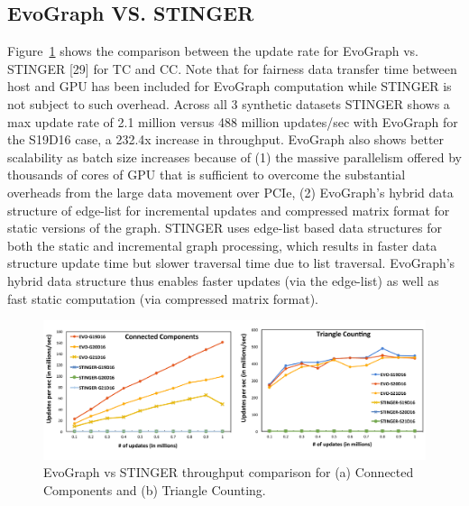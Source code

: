 \subsection{EvoGraph VS. STINGER}
Figure~\ref{fig:stinger} shows the comparison between the update rate for EvoGraph vs. STINGER [29] for TC and CC. Note that for fairness data transfer time between host and GPU has been included for EvoGraph computation while STINGER is not subject to such overhead. Across all 3 synthetic datasets STINGER shows a max update rate of 2.1 million versus 488 million updates/sec with EvoGraph for the S19D16 case, a 232.4x increase in throughput. EvoGraph also shows better scalability as batch size increases because of (1) the massive parallelism offered by thousands of cores of GPU that is sufficient to overcome the substantial overheads from the large data movement over PCIe, (2) EvoGraph’s hybrid data structure of edge-list for incremental updates and compressed matrix format for static versions of the graph. STINGER uses edge-list based data structures for both the static and incremental graph processing, which results in faster data structure update time but slower traversal time due to list traversal. EvoGraph’s hybrid data structure thus enables faster updates (via the edge-list) as well as fast static computation (via compressed matrix format). 

\begin{figure}[!t]
\centering
\includegraphics [width=\textwidth,height=\textheight,keepaspectratio]{figures/exp_stinger.pdf}
\caption{EvoGraph vs STINGER throughput comparison for (a) Connected Components and (b) Triangle Counting.}
\label{fig:stinger}
\end{figure}
